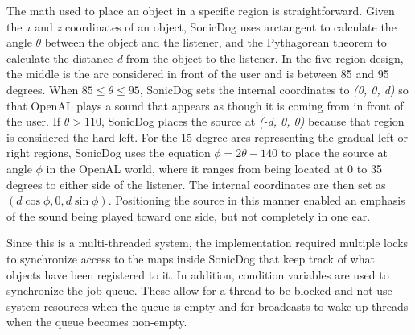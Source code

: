 The math used to place an object in a specific region is straightforward. Given
the \emph{x} and \emph{z} coordinates of an object, SonicDog uses arctangent to 
calculate the angle \begin{math}\theta\end{math} between the object and the 
listener, and the Pythagorean theorem to calculate the distance \emph{d} from the
object to the listener. In the five-region design, the middle is the arc 
considered in front of the user and is between 85 and 95 degrees. When 
\begin{math}85\leq\theta\leq95\end{math}, SonicDog sets the internal coordinates
to \emph{(0, 0, d)} so that OpenAL plays a sound that appears as though it is 
coming from in front of the user. If \begin{math}\theta>110\end{math}, SonicDog
places the source at \emph{(-d, 0, 0)} because that region is considered the 
hard left. For the 15 degree arcs representing the gradual left or right 
regions, SonicDog uses the equation \begin{math}\phi=2\theta-140\end{math} to 
place the source at angle \begin{math}\phi\end{math} in the OpenAL world, where 
it ranges from being located at 0 to 35 degrees to either side of the listener. 
The internal coordinates are then set as 
\begin{math}(d\cos\phi, 0, d\sin\phi)\end{math}. Positioning the source in this
manner enabled an emphasis of the sound being played toward one side, but not 
completely in one ear.

Since this is a multi-threaded system, the implementation required multiple
locks to synchronize access to the maps inside SonicDog that keep track of what
objects have been registered to it. In addition, condition variables are used to
synchronize the job queue. These allow for a thread to be blocked and not use 
system resources when the queue is empty and for broadcasts to wake up threads 
when the queue becomes non-empty.

